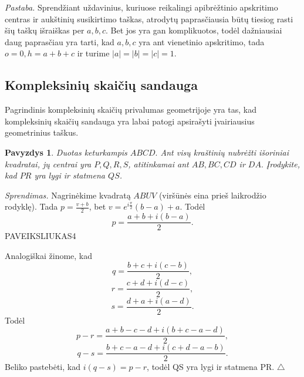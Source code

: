 \documentclass[11pt,a4paper,twoside]{book}
\newenvironment{sprendimas}{\noindent \textit{Sprendimas.}}{\hfill $\triangle$}
\newcounter{foo}[subsection]
\newtheorem{pavnr}[foo]{Pavyzdys}
\theoremstyle{definition} \newtheorem*{api}{Apibrėžimas}
\theoremstyle{remark} \newtheorem*{pastaba}{Pastaba}
\begin{document}
\textit {Pastaba.} Sprendžiant uždavinius, kuriuose reikalingi apibrėžtinio apskritimo centras ir aukštinių susikirtimo taškas, atrodytų paprasčiausia būtų tiesiog rasti šių taškų išraiškas per $a, b, c.$ Bet jos yra gan komplikuotos, todėl dažniausiai daug paprasčiau yra tarti, kad $a, b, c$ yra ant vienetinio apskritimo, tada $o=0, h=a+b+c$ ir turime $|a|=|b|=|c|=1$.






\subsection*{Kompleksinių skaičių sandauga}
Pagrindinis kompleksinių skaičių privalumas geometrijoje yra tas, kad kompleksinių skaičių sandauga yra labai patogi apsirašyti įvairiausius geometrinius taškus. 






\begin{pavnr}
Duotas keturkampis $ABCD.$ Ant visų kraštinių nubrėžti išoriniai kvadratai, jų centrai yra $P, Q, R, S$, atitinkamai ant $AB, BC, CD$ ir $DA.$ Įrodykite, kad $PR$ yra lygi ir statmena $QS$. 
\end{pavnr}
\begin{sprendimas}
Nagrinėkime kvadratą $ABUV$ (viršūnės eina prieš laikrodžio rodyklę). Tada $p=\frac{v+b}{2}$, bet $v=e^{i\frac{\pi}{2}}(b-a)+a$. Todėl $$p=\frac{a+b+i(b-a)}{2}.$$
PAVEIKSLIUKAS4

Analogiškai žinome, kad $$q=\frac{b+c+i(c-b)}{2},$$ $$r=\frac{c+d+i(d-c)}{2},$$ $$s=\frac{d+a+i(a-d)}{2}.$$
Todėl $$p-r=\frac{a+b-c-d+i(b+c-a-d)}{2},$$ $$q-s=\frac{b+c-a-d+i(c+d-a-b)}{2}.$$
Beliko pastebėti, kad $i(q-s)=p-r$, todėl QS yra lygi ir statmena PR.
\end{sprendimas}
\end{document}

